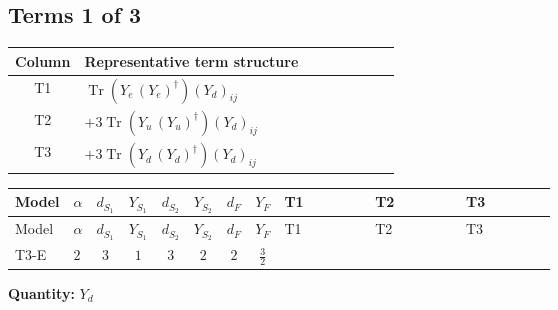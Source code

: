 \documentclass[8pt]{article}
\begin{document}
\begin{landscape}
\subsection*{Terms 1 of 3}
\begin{center}
\begin{tabular}{@{}c >{\raggedright\arraybackslash}p{0.82\linewidth}@{}}
\toprule
Column & Representative term structure \\
\midrule
T1 & \(\displaystyle \operatorname{Tr}\!\left({Y_e}\,\left({Y_e}\right)^{\dagger}\right) \left({Y_d}\right)_{ij}\) \\
\midrule
T2 & \(\displaystyle +3 \operatorname{Tr}\!\left({Y_u}\,\left({Y_u}\right)^{\dagger}\right) \left({Y_d}\right)_{ij}\) \\
\midrule
T3 & \(\displaystyle +3 \operatorname{Tr}\!\left({Y_d}\,\left({Y_d}\right)^{\dagger}\right) \left({Y_d}\right)_{ij}\) \\
\midrule
\bottomrule
\end{tabular}
\end{center}
\smallskip
\tiny
\begin{longtable}{@{}llcccccc >{\raggedright\arraybackslash}p{0.21\linewidth} >{\raggedright\arraybackslash}p{0.21\linewidth} >{\raggedright\arraybackslash}p{0.21\linewidth}@{}}
\toprule
Model & $\alpha$ & $d_{S_1}$ & $Y_{S_1}$ & $d_{S_2}$ & $Y_{S_2}$ & $d_F$ & $Y_F$ & T1 & T2 & T3 \\
\midrule
\endfirsthead
\toprule
Model & $\alpha$ & $d_{S_1}$ & $Y_{S_1}$ & $d_{S_2}$ & $Y_{S_2}$ & $d_F$ & $Y_F$ & T1 & T2 & T3 \\
\midrule
\endhead
T3-E & $2$ & $3$ & $1$ & $3$ & $2$ & $2$ & $\frac{3}{2}$ & \scriptsize\adjustbox{max width=\linewidth}{$\begin{gathered} \operatorname{Tr}\!\left({Y_e}\,\left({Y_e}\right)^{\dagger}\right) \left({Y_d}\right)_{ij}\end{gathered}$} & \scriptsize\adjustbox{max width=\linewidth}{$\begin{gathered} +3 \operatorname{Tr}\!\left({Y_u}\,\left({Y_u}\right)^{\dagger}\right) \left({Y_d}\right)_{ij}\end{gathered}$} & \scriptsize\adjustbox{max width=\linewidth}{$\begin{gathered} +3 \operatorname{Tr}\!\left({Y_d}\,\left({Y_d}\right)^{\dagger}\right) \left({Y_d}\right)_{ij}\end{gathered}$} \\
\midrule
\bottomrule
\end{longtable}
\clearpage
\noindent\textbf{Quantity: }$Y_d$\par\smallskip

\end{landscape}
\end{document}
